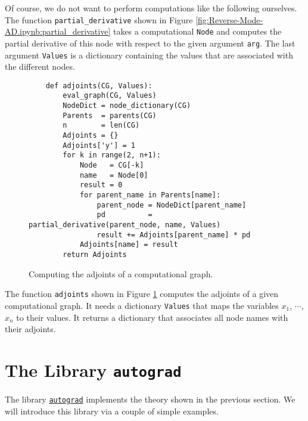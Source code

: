 Of course, we do not want to perform computations like the following ourselves.  The function
\texttt{partial\_derivative} shown in Figure \ref{fig:Reverse-Mode-AD.ipynb:partial_derivative} takes a
computational \texttt{Node} and computes the partial derivative of this node with respect to the given
argument \texttt{arg}.  The last argument \texttt{Values} is a dictionary containing the values that are
associated with the different nodes.
\FloatBarrier


\begin{figure}[h]
\centering
\begin{verbatim}
    def adjoints(CG, Values):
        eval_graph(CG, Values)
        NodeDict = node_dictionary(CG)
        Parents  = parents(CG)
        n        = len(CG)
        Adjoints = {}
        Adjoints['y'] = 1
        for k in range(2, n+1):
            Node   = CG[-k]
            name   = Node[0]
            result = 0
            for parent_name in Parents[name]:
                parent_node = NodeDict[parent_name]
                pd          = partial_derivative(parent_node, name, Values)
                result += Adjoints[parent_name] * pd
            Adjoints[name] = result
        return Adjoints
\end{verbatim}
\vspace*{-0.3cm}
\caption{Computing the adjoints of a computational graph.}
\label{fig:Reverse-Mode-AD.ipynb:adjoints}
\end{figure}


The function \texttt{adjoints} shown in Figure \ref{fig:Reverse-Mode-AD.ipynb:adjoints} computes the adjoints
of a given computational graph.  It needs a dictionary \texttt{Values} that maps the variables $x_1$, $\cdots$,
$x_n$ to their values.  It returns a dictionary that associates all node names with their adjoints.
\FloatBarrier

\section{The Library \texttt{autograd}}
The library \href{https://github.com/HIPS/autograd/}{\texttt{autograd}} implements the theory shown in the
previous section.  We will introduce this library via a couple of simple examples. 
  
